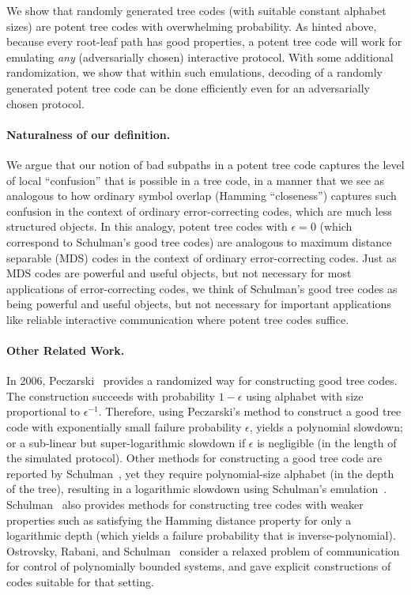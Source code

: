 \documentclass[ letterpaper, 11pt]{article}
\newcommand{\potent}{potent\xspace}
\begin{document}
We show that randomly generated tree codes (with suitable constant
alphabet sizes) are potent tree codes with overwhelming probability.
As hinted above, because every root-leaf path has good properties, a
potent tree code will work for emulating \emph{any} (adversarially
chosen) interactive protocol.  With some additional randomization,
we show that within such emulations, decoding of a randomly
generated potent tree code can be done efficiently even for an
adversarially chosen protocol.


\paragraph{Naturalness of our definition.}
We argue that our notion of bad subpaths in a \potent tree code
captures the level of local ``confusion'' that is possible in a tree
code, in a manner that we see as analogous to how ordinary symbol
overlap (Hamming ``closeness'') captures such confusion in the
context of ordinary error-correcting codes, which are much less
structured objects.  In this analogy, \potent tree codes with
$\epsilon=0$ (which correspond to Schulman's good tree codes) are
analogous to maximum distance separable (MDS) codes in the context
of ordinary error-correcting codes.  Just as MDS codes are powerful
and useful objects, but not necessary for most applications of
error-correcting codes, we think of Schulman's good tree codes as
being powerful and useful objects, but not necessary for important
applications like reliable interactive communication where \potent
tree codes suffice.


\paragraph{Other Related Work.}
In 2006, Peczarski~\cite{peczarski06} provides a randomized way for
constructing good tree codes. The construction succeeds with
probability $1-\epsilon$ using alphabet with size proportional to
$\epsilon^{-1}$. Therefore, using Peczarski's method to construct a
good tree code with exponentially small failure probability
$\epsilon$, yields a polynomial slowdown; or a sub-linear but
super-logarithmic slowdown if  $\epsilon$ is negligible (in the
length of the simulated protocol). Other methods for constructing a
good tree code are reported by Schulman~\cite{schulman-email}, yet
they require polynomial-size alphabet (in the depth of the tree),
resulting in a logarithmic slowdown using Schulman's
emulation~\cite{schulman93}. Schulman~\cite{schulman-email} also
provides methods for constructing tree codes with weaker properties
such as satisfying the Hamming distance property for only a
logarithmic depth (which yields a failure probability that is
inverse-polynomial). Ostrovsky, Rabani, and Schulman~\cite{ORS05}
consider a relaxed problem of communication for control of
polynomially bounded systems, and gave explicit constructions of
codes suitable for that setting.
\end{document}
